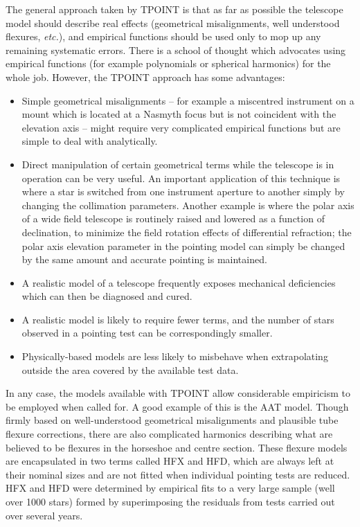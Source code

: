 The general approach taken by TPOINT is
that as far as possible the telescope model should
describe real effects (geometrical misalignments,
well understood flexures, {\it etc.}), and empirical functions
should be used only to mop up any remaining systematic
errors.  There is a school of thought which advocates
using empirical functions (for example polynomials or
spherical harmonics) for the whole job.  However, the
TPOINT approach has some advantages:
\begin{itemize}
\item Simple geometrical misalignments -- for example a miscentred
instrument on a mount which is located at a Nasmyth focus but is
not coincident with the elevation axis -- might require very
complicated empirical functions but are simple to deal with
analytically.
\item Direct manipulation of certain geometrical
terms while
the telescope is in operation can be very useful.  An important
application of this technique
is where a star is switched from one instrument
aperture to another simply by changing the collimation
parameters.  Another example is
where the
polar axis of a wide field telescope is routinely raised and
lowered as a function of declination,
to minimize the field rotation effects of differential
refraction; the polar axis elevation parameter in the pointing
model can simply be changed by the same amount
and accurate pointing is maintained.
\item A realistic model of a telescope frequently exposes
mechanical deficiencies which can then be diagnosed and cured.
\item A realistic model is likely to require fewer terms, and
the number of stars observed in a pointing test can be
correspondingly smaller.
\item Physically-based models are less likely to
misbehave when extrapolating outside the area covered by
the available test data.
\end{itemize}
In any case, the models available with TPOINT allow
considerable empiricism to be employed when called for.  A good example
of this is the AAT model.  Though firmly based on well-understood
geometrical misalignments and plausible tube flexure corrections,
there are also complicated harmonics describing
what are believed to be flexures in the horseshoe and centre
section.  These flexure models are encapsulated in two
terms called HFX and HFD, which are always left at their
nominal sizes and are not fitted when individual
pointing tests are reduced.  HFX and HFD were determined by
empirical fits to a very large sample (well over 1000 stars)
formed by superimposing the residuals from tests carried out
over several years.

